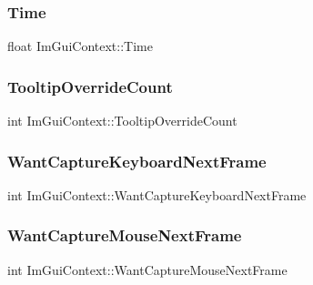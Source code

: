 \hypertarget{struct_im_gui_context_a88ebae89e11da57e4567767694f7576f}{}\label{struct_im_gui_context_a88ebae89e11da57e4567767694f7576f} 
\subsubsection{\texorpdfstring{Time}{Time}}
{\footnotesize\ttfamily float Im\+Gui\+Context\+::\+Time}

\hypertarget{struct_im_gui_context_a1c6e3c1b866fa1abf473d3cd9eafce0f}{}\label{struct_im_gui_context_a1c6e3c1b866fa1abf473d3cd9eafce0f} 
\subsubsection{\texorpdfstring{Tooltip\+Override\+Count}{TooltipOverrideCount}}
{\footnotesize\ttfamily int Im\+Gui\+Context\+::\+Tooltip\+Override\+Count}

\hypertarget{struct_im_gui_context_a0372056c72eac8b3e6de06c404caa5b3}{}\label{struct_im_gui_context_a0372056c72eac8b3e6de06c404caa5b3} 
\subsubsection{\texorpdfstring{Want\+Capture\+Keyboard\+Next\+Frame}{WantCaptureKeyboardNextFrame}}
{\footnotesize\ttfamily int Im\+Gui\+Context\+::\+Want\+Capture\+Keyboard\+Next\+Frame}

\hypertarget{struct_im_gui_context_a7e7a9bbeaac9519abe29818ce6c2cc3b}{}\label{struct_im_gui_context_a7e7a9bbeaac9519abe29818ce6c2cc3b} 
\subsubsection{\texorpdfstring{Want\+Capture\+Mouse\+Next\+Frame}{WantCaptureMouseNextFrame}}
{\footnotesize\ttfamily int Im\+Gui\+Context\+::\+Want\+Capture\+Mouse\+Next\+Frame}

